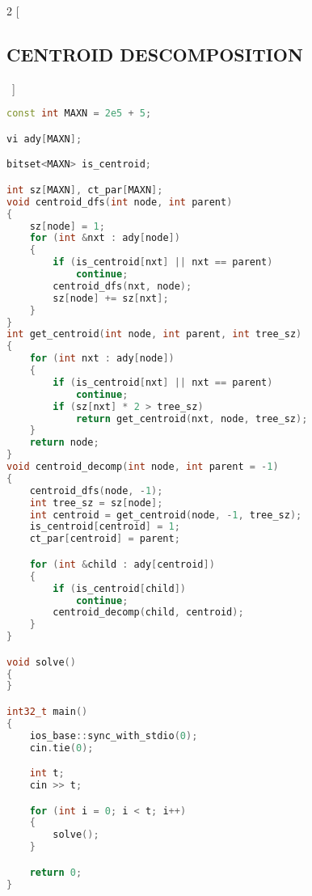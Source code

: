 \documentclass[leter]{amsart}
\begin{document}
\begin{multicols}{2}
[\subsection{CENTROID DESCOMPOSITION}\ ]
\begin{lstlisting}[language=C++]
const int MAXN = 2e5 + 5;

vi ady[MAXN];

bitset<MAXN> is_centroid;

int sz[MAXN], ct_par[MAXN];
void centroid_dfs(int node, int parent)
{
    sz[node] = 1;
    for (int &nxt : ady[node])
    {
        if (is_centroid[nxt] || nxt == parent)
            continue;
        centroid_dfs(nxt, node);
        sz[node] += sz[nxt];
    }
}
int get_centroid(int node, int parent, int tree_sz)
{
    for (int nxt : ady[node])
    {
        if (is_centroid[nxt] || nxt == parent)
            continue;
        if (sz[nxt] * 2 > tree_sz)
            return get_centroid(nxt, node, tree_sz);
    }
    return node;
}
void centroid_decomp(int node, int parent = -1)
{
    centroid_dfs(node, -1);
    int tree_sz = sz[node];
    int centroid = get_centroid(node, -1, tree_sz);
    is_centroid[centroid] = 1;
    ct_par[centroid] = parent;

    for (int &child : ady[centroid])
    {
        if (is_centroid[child])
            continue;
        centroid_decomp(child, centroid);
    }
}

void solve()
{
}

int32_t main()
{
    ios_base::sync_with_stdio(0);
    cin.tie(0);

    int t;
    cin >> t;

    for (int i = 0; i < t; i++)
    {
        solve();
    }

    return 0;
}
\end{lstlisting}
\end{multicols}
\end{document}
